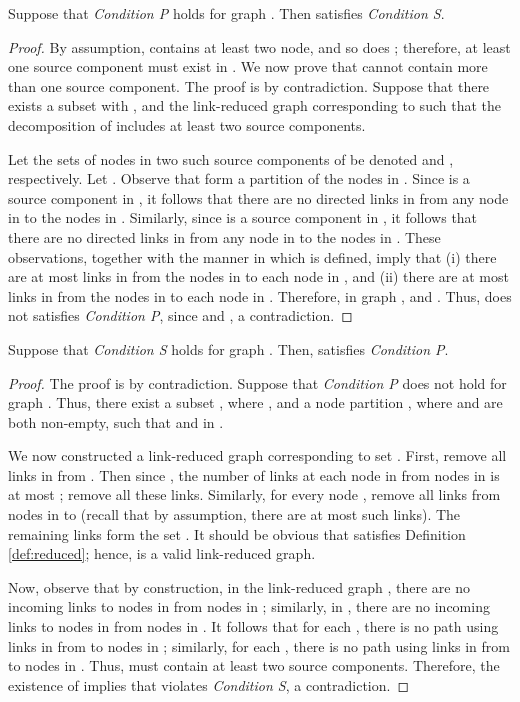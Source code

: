 \documentclass{llncs}
\newcommand{\fillbox}{\hspace*{\fill}}
\begin{document}
\begin{lemma}
\label{lemma:p-to-s}
Suppose that {\em Condition P} holds for graph . Then  satisfies {\em Condition S}.

\end{lemma}

\begin{proof}
By assumption, 
 contains at least two node, and so does ;
therefore, at least one
source component must exist in . We now prove that  cannot
contain more than one source component. The proof is by contradiction.
Suppose that there exists a subset  with ,
and the link-reduced graph 
 corresponding to  such
that the decomposition of  includes at least two source components.

Let the sets of nodes in two such source components of 
be denoted  and , respectively. Let .
Observe that  form a partition of the nodes in .
Since  is a source component in , it follows that
there are no directed links in  from any node in
 to the nodes in .
Similarly, since  is a source component in , it follows that
there are no directed links in  from any node in  to
the nodes in .
These observations, together with the manner in which 
is defined, imply that (i) there are at most  links in  from
the nodes in  to each node in , and
(ii) there are at most  links in  from
the nodes in  to each node in .
Therefore, in graph ,  and . Thus,  does not satisfies {\em Condition P}, since  and , a contradiction.
\fillbox
\end{proof}

\begin{lemma}
\label{lemma:s-to-p}
Suppose that {\em Condition S} holds for graph .
Then,  satisfies {\em Condition P}.
\end{lemma}

\begin{proof}
The proof is by contradiction. Suppose that {\em Condition P} does not hold for graph . Thus, there exist a subset , where , and a node partition , where  and  are both non-empty, such that  and  in .

We now constructed a link-reduced graph  corresponding to set . First, remove all links in  from . Then since , the number of links at each node in  from nodes in  is at most ; remove all these links. Similarly, for every node , remove all links from nodes in  to  (recall that by assumption, there are at most  such links). The remaining links form the set . It should be obvious that  satisfies Definition \ref{def:reduced}; hence,  is a valid link-reduced graph.

Now, observe that by construction, in the link-reduced graph  , there are no incoming links to nodes in  from nodes in ; similarly, in , there are no incoming links to nodes in  from nodes in . It follows that for each , there is no path using links in  from  to nodes in ; similarly, for each , there is no path using links in  from  to nodes in . Thus,  must contain at least two source components. Therefore, the existence of  implies that  violates {\em Condition S}, a contradiction.
\fillbox
\end{proof}
\end{document}
